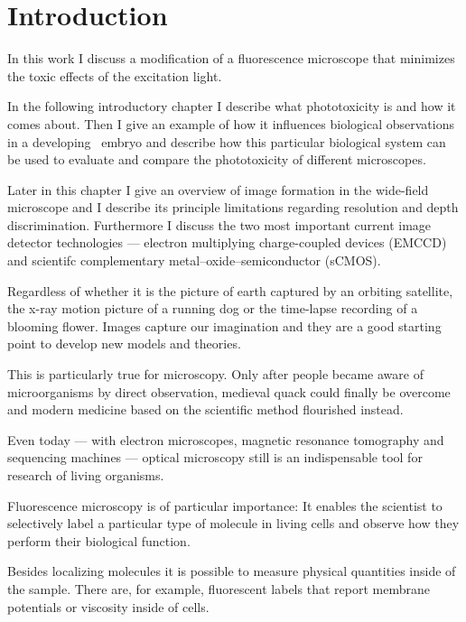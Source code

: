 \chapter{Introduction}
\label{sec:intro}
\begin{summary}
  In this work I discuss a modification of a fluorescence microscope    
  that minimizes the toxic effects of the excitation light.

  In the following introductory chapter I describe what phototoxicity   
  is and how it comes about. Then I give an example of how it
  influences biological observations in a developing \celegans\ 
  embryo and describe how this particular biological system can be
  used to evaluate and compare the phototoxicity of different microscopes.

  Later in this chapter I give an overview of image formation   
  in the wide-field microscope and I describe its principle limitations
  regarding resolution and depth discrimination. Furthermore I
  discuss the two most important current image detector technologies
  --- electron multiplying charge-coupled devices (EMCCD) and
  scientifc complementary metal–oxide–semiconductor (sCMOS).
\end{summary}
Regardless of whether it is the picture of earth captured by an
orbiting satellite, the x-ray motion picture of a running dog or the
time-lapse recording of a blooming flower. Images capture our
imagination and they are a good starting point to develop new models
and theories.

This is particularly true for microscopy.  Only after people became
aware of microorganisms by direct observation, medieval quack could
finally be overcome and modern medicine based on the scientific
method flourished instead.

Even today --- with electron microscopes, magnetic resonance
tomography and sequencing machines --- optical microscopy still is an
indispensable tool for research of living organisms.

Fluorescence microscopy is of particular importance: It enables the     
scientist to selectively label a particular type of molecule in living cells
and observe how they perform their biological function.

Besides localizing molecules it is possible to measure physical
quantities inside of the sample. There are, for example, fluorescent
labels that report membrane potentials or viscosity inside of cells.

